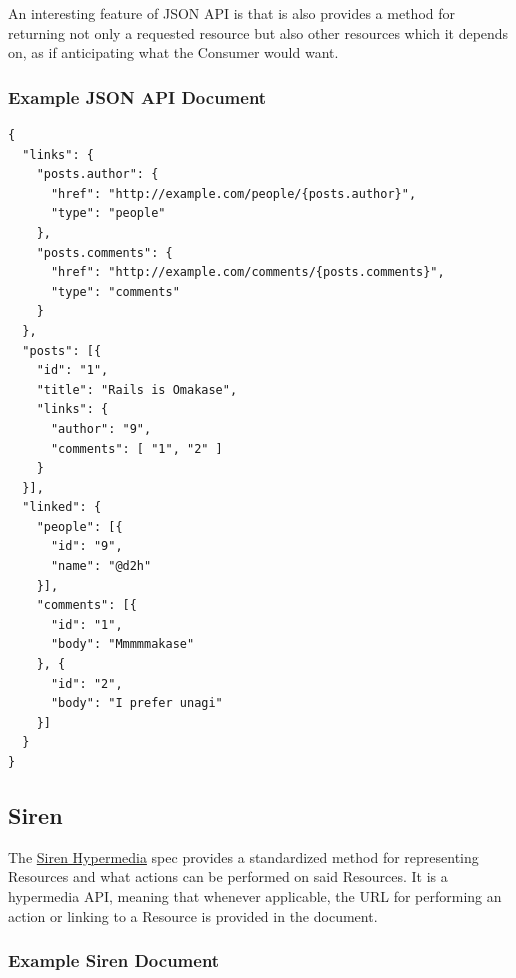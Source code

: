 \documentclass{book}
\begin{document}
An interesting feature of JSON API is that is also provides a method for returning not only a requested resource but also other resources which it depends on, as if anticipating what the Consumer would want.

\subsubsection{Example JSON API Document}

\begin{verbatim}
{
  "links": {
    "posts.author": {
      "href": "http://example.com/people/{posts.author}",
      "type": "people"
    },
    "posts.comments": {
      "href": "http://example.com/comments/{posts.comments}",
      "type": "comments"
    }
  },
  "posts": [{
    "id": "1",
    "title": "Rails is Omakase",
    "links": {
      "author": "9",
      "comments": [ "1", "2" ]
    }
  }],
  "linked": {
    "people": [{
      "id": "9",
      "name": "@d2h"
    }],
    "comments": [{
      "id": "1",
      "body": "Mmmmmakase"
    }, {
      "id": "2",
      "body": "I prefer unagi"
    }]
  }
}
\end{verbatim}

\subsection{Siren}

The \href{http://sirenspec.org}{Siren Hypermedia} spec provides a standardized method for representing Resources and what actions can be performed on said Resources. It is a hypermedia API, meaning that whenever applicable, the URL for performing an action or linking to a Resource is provided in the document.

\subsubsection{Example Siren Document}
\end{document}
